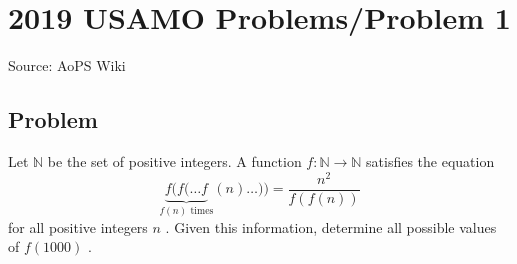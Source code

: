 \documentclass[12pt]{article}
\begin{document}
\section*{{2019 USAMO Problems/Problem 1}}
Source: AoPS Wiki

\subsection*{Problem}
Let $\mathbb{N}$ be the set of positive integers. A function $f:\mathbb{N}\to\mathbb{N}$ satisfies the equation \[\underbrace{f(f(\ldots f}_{f(n)\text{ times}}(n)\ldots))=\frac{n^2}{f(f(n))}\] for all positive integers $n$ . Given this information, determine all possible values of $f(1000)$ .
\end{document}
